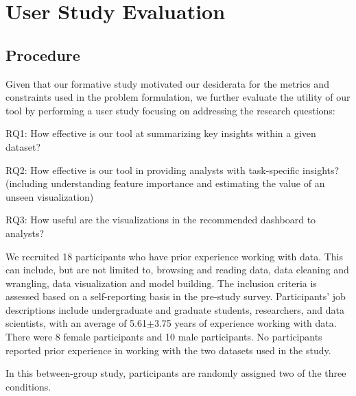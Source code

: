 \section{User Study Evaluation}
\subsection{Procedure}
Given that our formative study motivated our desiderata for the metrics and constraints used in the problem formulation, we further evaluate the utility of our tool by performing a user study focusing on addressing the research questions: 
\begin{denselist}
	\item RQ1: How effective is our tool at summarizing key insights within a given dataset?
	\item RQ2: How effective is our tool in providing analysts with task-specific insights? (including understanding feature importance and estimating the value of an unseen visualization) 
	\item RQ3: How useful are the visualizations in the recommended dashboard to analysts?
\end{denselist}
We recruited 18 participants who have prior experience working with data. This can include, but are not limited to, browsing and reading data, data cleaning and wrangling, data visualization and model building. The inclusion criteria is assessed based on a self-reporting basis in the pre-study survey. Participants' job descriptions include undergraduate and graduate students, researchers, and data scientists, with an average of 5.61$\pm$3.75 years of experience working with data. There were 8 female participants and 10 male participants. No participants reported prior experience in working with the two datasets used in the study.
\par In this between-group study, participants are randomly assigned two of the three conditions. 
